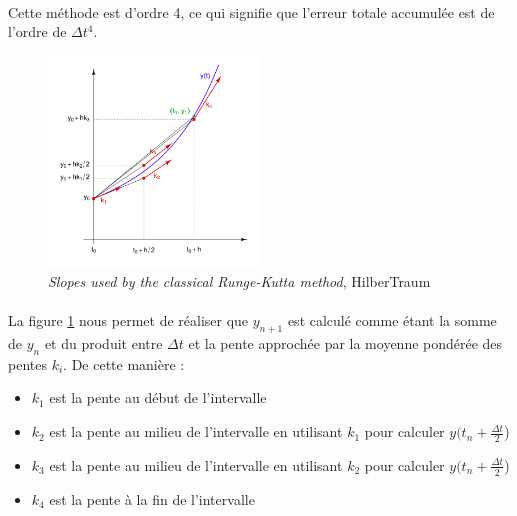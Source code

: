         \paragraph{}
        Cette méthode est d'ordre 4, ce qui signifie que l'erreur totale accumulée est de l'ordre de $\Delta t^4$.
        \begin{figure}
            \centering
            \includegraphics[width=0.5\textwidth]{images/rk_pentes.png}
            \caption{\textit{Slopes used by the classical Runge-Kutta method}, HilberTraum}
            \label{fig:pentes_rk}
        \end{figure}

        \paragraph{}
        La figure \ref{fig:pentes_rk} nous permet de réaliser que $y_{n+1}$ est calculé comme étant la somme de $y_n$ et du produit entre $\Delta t$ et la pente approchée par la moyenne pondérée des pentes $k_i$. De cette manière :
        \begin{itemize}
            \item $k_1$ est la pente au début de l'intervalle
            \item $k_2$ est la pente au milieu de l'intervalle en utilisant $k_1$ pour calculer $y(t_n + \frac{\Delta t}{2}$)
            \item $k_3$ est la pente au milieu de l'intervalle en utilisant $k_2$ pour calculer $y(t_n + \frac{\Delta t}{2}$)
            \item $k_4$ est la pente à la fin de l'intervalle
        \end{itemize}

